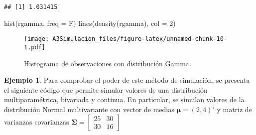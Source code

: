 \documentclass[
  spanish,
]{book}
\newenvironment{Shaded}{\begin{snugshade}}{\end{snugshade}}
\newcommand{\AttributeTok}[1]{\textcolor[rgb]{0.77,0.63,0.00}{#1}}
\newcommand{\DecValTok}[1]{\textcolor[rgb]{0.00,0.00,0.81}{#1}}
\newcommand{\FunctionTok}[1]{\textcolor[rgb]{0.00,0.00,0.00}{#1}}
\newcommand{\NormalTok}[1]{#1}
\theoremstyle{definition}
\theoremstyle{definition}
\newtheorem{example}{Ejemplo}[chapter]
\theoremstyle{definition}
\theoremstyle{definition}
\theoremstyle{remark}
\begin{document}
\begin{verbatim}
## [1] 1.031415
\end{verbatim}

\begin{Shaded}
\begin{Highlighting}[]
\FunctionTok{hist}\NormalTok{(rgamma, }\AttributeTok{freq =}\NormalTok{ F)}
\FunctionTok{lines}\NormalTok{(}\FunctionTok{density}\NormalTok{(rgamma), }\AttributeTok{col =} \DecValTok{2}\NormalTok{)}
\end{Highlighting}
\end{Shaded}

\begin{figure}
\centering
\texttt{[image: A3Simulacion\_files/figure-latex/unnamed-chunk-10-1.pdf]}
\caption{\label{fig:unnamed-chunk-10}Histograma de observaciones con distribución Gamma.}
\end{figure}

\begin{example}
\protect\hypertarget{exm:unnamed-chunk-11}{}{\label{exm:unnamed-chunk-11} }Para comprobar el poder de este método de simulación, se presenta el siguiente código que permite simular valores de una distribución multiparamétrica, bivariada y continua. En particular, se simulan valores de la distribución Normal multivariante con vector de medias \(\boldsymbol \mu= (2, 4)'\) y matriz de varianzas covarianzas
\(\boldsymbol \Sigma= \begin{bmatrix} 25 & 30 \\ 30 & 16 \end{bmatrix}\)
\end{example}
\end{document}
